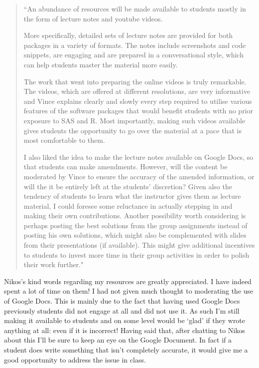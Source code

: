 \documentclass[a4paper,12pt]{article}
\begin{document}
\begin{quote}
``An abundance of resources will be made available to students mostly in the form of lecture notes and youtube videos.

More specifically, detailed sets of lecture notes are provided for both packages in a variety of formats. The notes include screenshots and code snippets, are engaging and are prepared in a conversational style, which can help students master the material more easily.

The work that went into preparing the online videos is truly remarkable. The videos, which are offered at different resolutions, are very informative and Vince explains clearly and slowly every step required to utilise various features of the software packages that would benefit students with no prior exposure to SAS and R. Most importantly, making such videos available gives students the opportunity to go over the material at a pace that is most comfortable to them.

I also liked the idea to make the lecture notes available on Google Docs, so that students can make amendments. However, will the content be  moderated by Vince to ensure the accuracy of the amended information, or will the it be entirely left at the students' discretion? Given also the tendency of students to learn what the instructor gives them as lecture material, I could foresee some reluctance in actually stepping in and making their own contributions. Another possibility worth considering is perhaps posting the best solutions from the group assignments instead of posting his own solutions, which might also be complemented with slides from their presentations (if available). This might give additional incentives to students to invest more time in their group activities in order to polish their work further."\end{quote}

Nikos's kind words regarding my resources are greatly appreciated. I have indeed spent a lot of time on them! I had not given much thought to moderating the use of Google Docs. This is mainly due to the fact that having used Google Docs previously students did not engage at all and did not use it. As such I'm still making it available to students and on some level would be `glad' if they wrote anything at all: even if it is incorrect! Having said that, after chatting to Nikos about this I'll be sure to keep an eye on the Google Document. In fact if a student does write something that isn't completely accurate, it would give me a good opportunity to address the issue in class.
\end{document}
